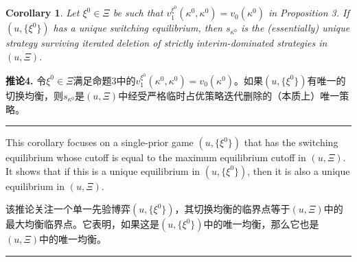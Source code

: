 \documentclass[12pt,a4paper]{article}
\newenvironment{original}
  {\par\medskip\noindent\color{black}\ignorespaces}
  {\par\medskip}
\newenvironment{translation}
  {\par\noindent\color{darkblue}\ignorespaces}
  {\par\medskip\noindent\hrule\par\medskip}
\newtheorem{corollary}[theorem]{Corollary}
\theoremstyle{definition}
\theoremstyle{remark}
\begin{document}
\begin{corollary}
Let $\xi^0 \in \Xi$ be such that $v_1^{\xi^0}(\kappa^0, \kappa^0) = v_0(\kappa^0)$ in Proposition 3. If $(u, \{\xi^0\})$ has a unique switching equilibrium, then $s_{\kappa^0}$ is the (essentially) unique strategy surviving iterated deletion of strictly interim-dominated strategies in $(u, \Xi)$.
\end{corollary}
\begin{translation}
\color{darkblue}\textbf{推论4.} 令$\xi^0 \in \Xi$满足命题3中的$v_1^{\xi^0}(\kappa^0, \kappa^0) = v_0(\kappa^0)$。如果$(u, \{\xi^0\})$有唯一的切换均衡，则$s_{\kappa^0}$是$(u, \Xi)$中经受严格临时占优策略迭代删除的（本质上）唯一策略。
\end{translation}
\begin{original}
This corollary focuses on a single-prior game $(u, \{\xi^0\})$ that has the switching equilibrium whose cutoff is equal to the maximum equilibrium cutoff in $(u, \Xi)$. It shows that if this is a unique equilibrium in $(u, \{\xi^0\})$, then it is also a unique equilibrium in $(u, \Xi)$.
\end{original}
\begin{translation}
该推论关注一个单一先验博弈$(u, \{\xi^0\})$，其切换均衡的临界点等于$(u, \Xi)$中的最大均衡临界点。它表明，如果这是$(u, \{\xi^0\})$中的唯一均衡，那么它也是$(u, \Xi)$中的唯一均衡。
\end{translation}
\end{document}

